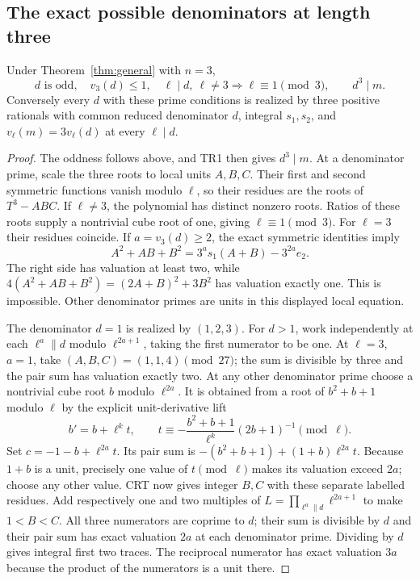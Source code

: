 \subsection{The exact possible denominators at length three}
\begin{theorem}\label{thm:three}
Under Theorem~\ref{thm:general} with $n=3$,
\[
 \boxed{d\text{ is odd},\quad v_3(d)\le1,\quad
 \ell\mid d,\ \ell\ne3\Longrightarrow\ell\equiv1\pmod3,
 \qquad d^3\mid m.}                                   \tag{TR5}
\]
Conversely every $d$ with these prime conditions is realized by three positive
rationals with common reduced denominator $d$, integral $s_1,s_2$, and
$v_\ell(m)=3v_\ell(d)$ at every $\ell\mid d$.
\end{theorem}
\begin{proof}
The oddness follows above, and TR1 then gives $d^3\mid m$. At a denominator
prime, scale the three roots to local units $A,B,C$. Their first and second
symmetric functions vanish modulo $\ell$, so their residues are the roots of
$T^3-ABC$. If $\ell\ne3$, the polynomial has distinct nonzero roots. Ratios of
these roots supply a nontrivial cube root of one, giving $\ell\equiv1\pmod3$.
For $\ell=3$ their residues coincide. If $a=v_3(d)\ge2$, the exact symmetric
identities imply
\[
 A^2+AB+B^2=3^a s_1(A+B)-3^{2a}e_2.
\]
The right side has valuation at least two, while
$4(A^2+AB+B^2)=(2A+B)^2+3B^2$ has valuation exactly one. This is impossible.
Other denominator primes are units in this displayed local equation.

The denominator $d=1$ is realized by $(1,2,3)$. For $d>1$, work independently at each $\ell^a\parallel d$ modulo
$\ell^{2a+1}$, taking the first numerator to be one. At $\ell=3$, $a=1$, take
$(A,B,C)=(1,1,4)\pmod{27}$; the sum is divisible by three and the pair sum has
valuation exactly two. At any other denominator prime choose a nontrivial cube
root $b$ modulo $\ell^{2a}$. It is obtained from a root of $b^2+b+1$ modulo
$\ell$ by the explicit unit-derivative lift
\[
 b'=b+\ell^k t,\qquad
 t\equiv-\frac{b^2+b+1}{\ell^k}(2b+1)^{-1}\pmod\ell.
\]
Set $c=-1-b+\ell^{2a}t$. Its pair sum is
$-(b^2+b+1)+(1+b)\ell^{2a}t$. Because $1+b$ is a unit, precisely one value
of $t\pmod\ell$ makes its valuation exceed $2a$; choose any other value.
CRT now gives integer $B,C$ with these separate labelled residues. Add
respectively one and two multiples of
$L=\prod_{\ell^a\parallel d}\ell^{2a+1}$ to make $1<B<C$.
All three numerators are coprime to $d$; their sum is divisible by $d$ and their
pair sum has exact valuation $2a$ at each denominator prime. Dividing by $d$
gives integral first two traces. The reciprocal numerator has exact valuation
$3a$ because the product of the numerators is a unit there.
\end{proof}
